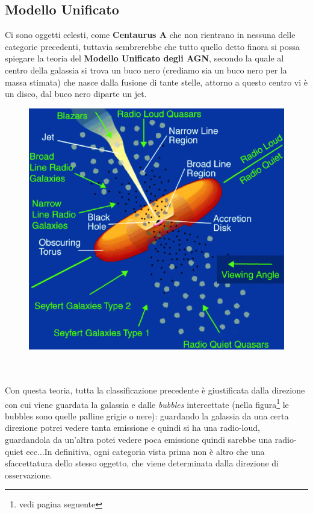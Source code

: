 \documentclass[a4paper,11pt]{article}
\begin{document}
\subsection{Modello Unificato}
Ci sono oggetti celesti, come \textbf{Centaurus A} che non rientrano in nessuna delle categorie precedenti, tuttavia sembrerebbe che tutto quello detto finora si possa spiegare la teoria del \textbf{Modello Unificato degli AGN}, secondo la quale al centro della galassia si trova un buco nero (crediamo sia un buco nero per la massa stimata) che nasce dalla fusione di tante stelle, attorno a questo centro vi è un disco, dal buco nero diparte un jet.
\begin{figure}
        \centering
        \includegraphics[width=\textwidth]{immagini_lezioni12-12/51.png}
        \label{}
    \end{figure}\\
\\Con questa teoria, tutta la classificazione precedente è giustificata dalla direzione con cui viene guardata la galassia e dalle \textit{bubbles} intercettate (nella figura\footnote{vedi pagina seguente} le bubbles sono quelle palline grigie o nere): guardando la galassia da una certa direzione potrei vedere tanta emissione e quindi si ha una radio-loud, guardandola da un'altra potei vedere poca emissione quindi sarebbe una radio-quiet ecc...In definitiva, ogni categoria vista prima non è altro che una sfaccettatura dello stesso oggetto, che viene determinata dalla direzione di osservazione.
\end{document}

